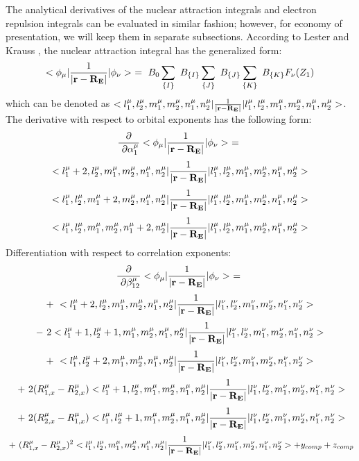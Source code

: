 The analytical derivatives of the nuclear attraction integrals and electron
repulsion integrals can be evaluated in similar fashion; however, for
economy of presentation, we will keep them in separate subsections.
According to Lester and Krauss \cite{les64}, the nuclear attraction integral
has the generalized form: 
\begin{equation}
<\phi _\mu |{\frac 1{|{\bf r}-{\bf R_E}|}}|\phi _\nu >\ =\ B_0\sum_{\{I\}}\
B_{\{I\}}\sum_{\{J\}}\ B_{\{J\}}\sum_{\{K\}}\ B_{\{K\}}F_\nu (Z_1)
\end{equation}
which can be denoted as $<l_1^\mu ,l_2^\mu ,m_1^\mu ,m_2^\mu ,n_1^\mu
,n_2^\mu |{\frac 1{|{\bf r}-{\bf R_E}|}}|l_1^\mu ,l_2^\mu ,m_1^\mu ,m_2^\mu
,n_1^\mu ,n_2^\mu >$. The derivative with respect to orbital exponents has
the following form: 
\[
{\frac \partial {{\ \partial \alpha _1^\mu }}}<\phi _\mu |{\frac 1{|{\bf r}-%
{\bf R_E}|}}|\phi _\nu >\ =\ 
\]
\[
<l_1^\mu +2,l_2^\mu ,m_1^\mu ,m_2^\mu ,n_1^\mu ,n_2^\mu |{\frac 1{|{\bf r}-%
{\bf R_E}|}}|l_1^\mu ,l_2^\mu ,m_1^\mu ,m_2^\mu ,n_1^\mu ,n_2^\mu >
\]
\[
<l_1^\mu ,l_2^\mu ,m_1^\mu +2,m_2^\mu ,n_1^\mu ,n_2^\mu |{\frac 1{|{\bf r}-%
{\bf R_E}|}}|l_1^\mu ,l_2^\mu ,m_1^\mu ,m_2^\mu ,n_1^\mu ,n_2^\mu >
\]
\begin{equation}
<l_1^\mu ,l_2^\mu ,m_1^\mu ,m_2^\mu ,n_1^\mu +2,n_2^\mu |{\frac 1{|{\bf r}-%
{\bf R_E}|}}|l_1^\mu ,l_2^\mu ,m_1^\mu ,m_2^\mu ,n_1^\mu ,n_2^\mu >
\end{equation}
Differentiation with respect to correlation exponents: 
\[
{\frac \partial {{\ \partial \beta _{12}^\mu }}}<\phi _\mu |{\frac 1{|{\bf r}%
-{\bf R_E}|}}|\phi _\nu >\ =\ 
\]
\[
+\ <l_1^\mu +2,l_2^\mu ,m_1^\mu ,m_2^\mu ,n_1^\mu ,n_2^\mu |{\frac 1{|{\bf r}%
-{\bf R_E}|}}|l_1^\nu ,l_2^\nu ,m_1^\nu ,m_2^\nu ,n_1^\nu ,n_2^\nu >
\]
\[
-\ 2<l_1^\mu +1,l_2^\mu +1,m_1^\mu ,m_2^\mu ,n_1^\mu ,n_2^\mu |{\frac 1{|%
{\bf r}-{\bf R_E}|}}|l_1^\nu ,l_2^\nu ,m_1^\nu ,m_2^\nu ,n_1^\nu ,n_2^\nu >
\]
\[
+\ <l_1^\mu ,l_2^\mu +2,m_1^\mu ,m_2^\mu ,n_1^\mu ,n_2^\mu |{\frac 1{|{\bf r}%
-{\bf R_E}|}}|l_1^\nu ,l_2^\nu ,m_1^\nu ,m_2^\nu ,n_1^\nu ,n_2^\nu >
\]
\[
\ +\ 2(R_{1,x}^\mu -R_{2,x}^\mu )<l_1^\mu +1,l_2^\mu ,m_1^\mu ,m_2^\mu
,n_1^\mu ,n_2^\mu |{\frac 1{|{\bf r}-{\bf R_E}|}}|l_1^\nu ,l_2^\nu ,m_1^\nu
,m_2^\nu ,n_1^\nu ,n_2^\nu >
\]
\[
\ +\ 2(R_{2,x}^\mu -R_{1,x}^\mu )<l_1^\mu ,l_2^\mu +1,m_1^\mu ,m_2^\mu
,n_1^\mu ,n_2^\mu |{\frac 1{|{\bf r}-{\bf R_E}|}}|l_1^\nu ,l_2^\nu ,m_1^\nu
,m_2^\nu ,n_1^\nu ,n_2^\nu >
\]
\begin{equation}
\ +\ (R_{1,x}^\mu -R_{2,x}^\mu )^2<l_1^\mu ,l_2^\mu ,m_1^\mu ,m_2^\mu
,n_1^\mu ,n_2^\mu |{\frac 1{|{\bf r}-{\bf R_E}|}}|l_1^\nu ,l_2^\nu ,m_1^\nu
,m_2^\nu ,n_1^\nu ,n_2^\nu >+y_{comp}+z_{comp}
\end{equation}
